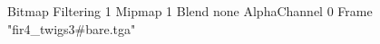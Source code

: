 {Bitmap
	{Filtering 1}
	{Mipmap 1}
	{Blend none}
	{AlphaChannel 0}
	{Frame "fir4_twigs3#bare.tga"}
}
